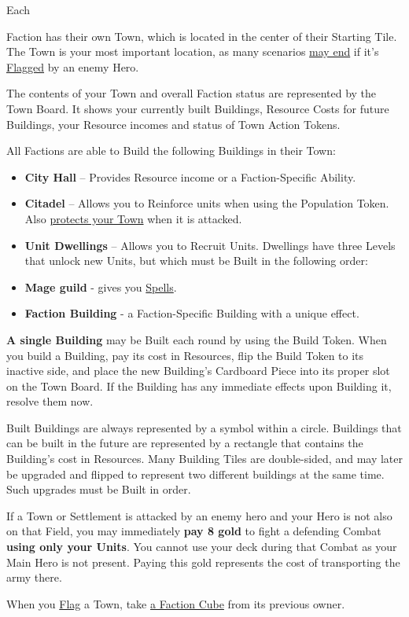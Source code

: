 
\begin{multicols*}{2}

\hypertarget{Town}{Each} Faction has their own Town, which is located in the center of their Starting Tile.
The Town is your most important location, as many scenarios \hyperlink{End}{may end} if it's \hyperlink{Categories}{Flagged} by an enemy Hero.\par
The contents of your Town and overall Faction status are represented by the Town Board.
It shows your currently built Buildings, Resource Costs for future Buildings, your Resource incomes and status of Town Action Tokens.\par
All Factions are able to Build the following Buildings in their Town:
\begin{itemize}
  \item \textbf{City Hall} – Provides Resource income or a Faction-Specific Ability.
  \item \textbf{Citadel} – Allows you to Reinforce units when using the Population Token.
Also \hyperlink{Walls}{protects your Town} when it is attacked.
  \item \textbf{Unit Dwellings} – Allows you to Recruit Units.
Dwellings have three Levels that unlock new Units, but which must be Built in the following order:
  \item \textbf{Mage guild} - gives you \hyperlink{spells}{Spells}.
  \item \textbf{Faction Building} - a Faction-Specific Building with a unique effect.
\end{itemize}
\textbf{A single Building} may be Built each round by using the Build Token.
When you build a Building, pay its cost in Resources, flip the Build Token to its inactive side, and place the new Building’s Cardboard Piece into its proper slot on the Town Board.
If the Building has any immediate effects upon Building it, resolve them now.\par
Built Buildings are always represented by a symbol within a circle.
Buildings that can be built in the future are represented by a rectangle that contains the Building's cost in Resources.
Many Building Tiles are double-sided, and may later be upgraded and flipped to represent two different buildings at the same time. Such upgrades must be Built in order.\par
If a Town or Settlement is attacked by an enemy hero and your Hero is not also on that Field, you may immediately \textbf{pay 8 gold} to fight a defending Combat \textbf{using only your Units}.
You cannot use your deck during that Combat as your Main Hero is not present.
Paying this gold represents the cost of transporting the army there.\par
When you \hyperlink{Categories}{Flag} a Town, take \hyperlink{End}{a Faction Cube} from its previous owner.


\end{multicols*}
